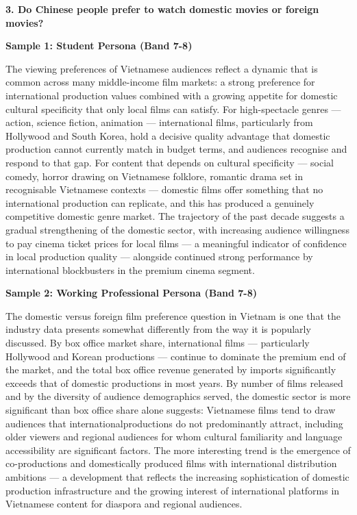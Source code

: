 \separator

\begin{ieltsquestion}
\textbf{3. Do Chinese people prefer to watch domestic movies or foreign movies?}
\end{ieltsquestion}
\textbf{Sample 1: Student Persona (Band 7-8)}

The viewing preferences of Vietnamese audiences reflect a dynamic that is common across many middle-income film markets: a strong preference for international production values combined with a growing appetite for domestic cultural specificity that only local films can satisfy. For high-spectacle genres — action, science fiction, animation — international films, particularly from Hollywood and South Korea, hold a decisive quality advantage that domestic production cannot currently match in budget terms, and audiences recognise and respond to that gap. For content that depends on cultural specificity — social comedy, horror drawing on Vietnamese folklore, romantic drama set in recognisable Vietnamese contexts — domestic films offer something that no international production can replicate, and this has produced a genuinely competitive domestic genre market. The trajectory of the past decade suggests a gradual strengthening of the domestic sector, with increasing audience willingness to pay cinema ticket prices for local films — a meaningful indicator of confidence in local production quality — alongside continued strong performance by international blockbusters in the premium cinema segment.

\textbf{Sample 2: Working Professional Persona (Band 7-8)}

The domestic versus foreign film preference question in Vietnam is one that the industry data presents somewhat differently from the way it is popularly discussed. By box office market share, international films — particularly Hollywood and Korean productions — continue to dominate the premium end of the market, and the total box office revenue generated by imports significantly exceeds that of domestic productions in most years. By number of films released and by the diversity of audience demographics served, the domestic sector is more significant than box office share alone suggests: Vietnamese films tend to draw audiences that internationalproductions do not predominantly attract, including older viewers and regional audiences for whom cultural familiarity and language accessibility are significant factors. The more interesting trend is the emergence of co-productions and domestically produced films with international distribution ambitions — a development that reflects the increasing sophistication of domestic production infrastructure and the growing interest of international platforms in Vietnamese content for diaspora and regional audiences.

